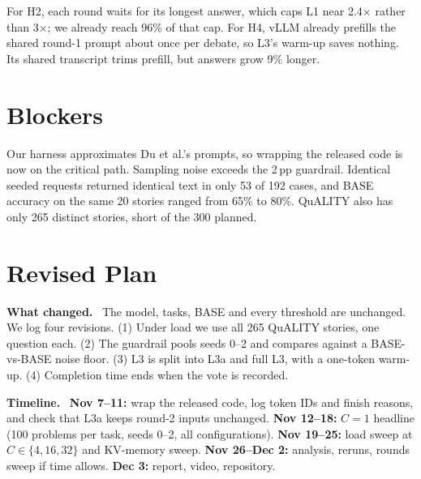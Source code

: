 \documentclass[11pt,letterpaper]{article}
\newcommand{\head}[1]{\textbf{#1}\ }
\begin{document}
\smallskip
For H2, each round waits for its longest answer, which caps L1 near 2.4$\times$ rather than 3$\times$; we already reach 96\% of that cap. For H4, vLLM already prefills the shared round-1 prompt about once per debate, so L3's warm-up saves nothing. Its shared transcript trims prefill, but answers grow 9\% longer.

\section{Blockers}
Our harness approximates Du et al.'s prompts, so wrapping the released code is now on the critical path. Sampling noise exceeds the 2\,pp guardrail. Identical seeded requests returned identical text in only 53 of 192 cases, and BASE accuracy on the same 20 stories ranged from 65\% to 80\%. QuALITY also has only 265 distinct stories, short of the 300 planned.

\section{Revised Plan}
\head{What changed.} The model, tasks, BASE and every threshold are unchanged. We log four revisions. (1) Under load we use all 265 QuALITY stories, one question each. (2) The guardrail pools seeds 0--2 and compares against a BASE-vs-BASE noise floor. (3) L3 is split into L3a and full L3, with a one-token warm-up. (4) Completion time ends when the vote is recorded.

\head{Timeline.} \textbf{Nov 7--11:} wrap the released code, log token IDs and finish reasons, and check that L3a keeps round-2 inputs unchanged. \textbf{Nov 12--18:} $C{=}1$ headline (100 problems per task, seeds 0--2, all configurations). \textbf{Nov 19--25:} load sweep at $C\in\{4,16,32\}$ and KV-memory sweep. \textbf{Nov 26--Dec 2:} analysis, reruns, rounds sweep if time allows. \textbf{Dec 3:} report, video, repository.
\end{document}
